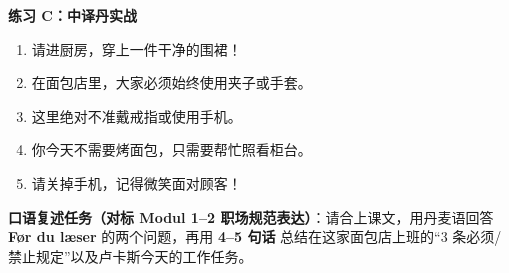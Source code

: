 \textbf{练习 C：中译丹实战}
\begin{enumerate}
  \item 请进厨房，穿上一件干净的围裙！
  \item 在面包店里，大家必须始终使用夹子或手套。
  \item 这里绝对不准戴戒指或使用手机。
  \item 你今天不需要烤面包，只需要帮忙照看柜台。
  \item 请关掉手机，记得微笑面对顾客！
\end{enumerate}


\textbf{口语复述任务（对标 Modul 1--2 职场规范表达）}：请合上课文，用丹麦语回答 \textbf{Før du læser} 的两个问题，再用 \textbf{4--5 句话} 总结在这家面包店上班的“3 条必须/禁止规定”以及卢卡斯今天的工作任务。

